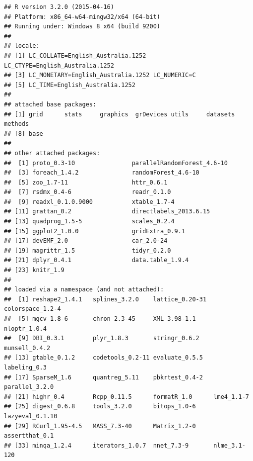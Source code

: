 \documentclass{grattan}\usepackage[]{graphicx}\usepackage[]{color}
\makeatletter
\newenvironment{kframe}{%
 \def\at@end@of@kframe{}%
 \ifinner\ifhmode%
  \def\at@end@of@kframe{\end{minipage}}%
  \begin{minipage}{\columnwidth}%
 \fi\fi%
 \def\FrameCommand##1{\hskip\@totalleftmargin \hskip-\fboxsep
 \colorbox{shadecolor}{##1}\hskip-\fboxsep
     \hskip-\linewidth \hskip-\@totalleftmargin \hskip\columnwidth}%
 \MakeFramed {\advance\hsize-\width
   \@totalleftmargin\z@ \linewidth\hsize
   \@setminipage}}%
 {\par\unskip\endMakeFramed%
 \at@end@of@kframe}
\newenvironment{knitrout}{}{} %
\makeatother
\begin{document}
\begin{knitrout}
\color{fgcolor}\begin{kframe}
\begin{verbatim}
## R version 3.2.0 (2015-04-16)
## Platform: x86_64-w64-mingw32/x64 (64-bit)
## Running under: Windows 8 x64 (build 9200)
## 
## locale:
## [1] LC_COLLATE=English_Australia.1252  LC_CTYPE=English_Australia.1252   
## [3] LC_MONETARY=English_Australia.1252 LC_NUMERIC=C                      
## [5] LC_TIME=English_Australia.1252    
## 
## attached base packages:
## [1] grid      stats     graphics  grDevices utils     datasets  methods  
## [8] base     
## 
## other attached packages:
##  [1] proto_0.3-10                parallelRandomForest_4.6-10
##  [3] foreach_1.4.2               randomForest_4.6-10        
##  [5] zoo_1.7-11                  httr_0.6.1                 
##  [7] rsdmx_0.4-6                 readr_0.1.0                
##  [9] readxl_0.1.0.9000           xtable_1.7-4               
## [11] grattan_0.2                 directlabels_2013.6.15     
## [13] quadprog_1.5-5              scales_0.2.4               
## [15] ggplot2_1.0.0               gridExtra_0.9.1            
## [17] devEMF_2.0                  car_2.0-24                 
## [19] magrittr_1.5                tidyr_0.2.0                
## [21] dplyr_0.4.1                 data.table_1.9.4           
## [23] knitr_1.9                  
## 
## loaded via a namespace (and not attached):
##  [1] reshape2_1.4.1   splines_3.2.0    lattice_0.20-31  colorspace_1.2-4
##  [5] mgcv_1.8-6       chron_2.3-45     XML_3.98-1.1     nloptr_1.0.4    
##  [9] DBI_0.3.1        plyr_1.8.3       stringr_0.6.2    munsell_0.4.2   
## [13] gtable_0.1.2     codetools_0.2-11 evaluate_0.5.5   labeling_0.3    
## [17] SparseM_1.6      quantreg_5.11    pbkrtest_0.4-2   parallel_3.2.0  
## [21] highr_0.4        Rcpp_0.11.5      formatR_1.0      lme4_1.1-7      
## [25] digest_0.6.8     tools_3.2.0      bitops_1.0-6     lazyeval_0.1.10 
## [29] RCurl_1.95-4.5   MASS_7.3-40      Matrix_1.2-0     assertthat_0.1  
## [33] minqa_1.2.4      iterators_1.0.7  nnet_7.3-9       nlme_3.1-120
\end{verbatim}
\end{kframe}
\end{knitrout}
\twocolumn

\printbibliography
\end{document}
